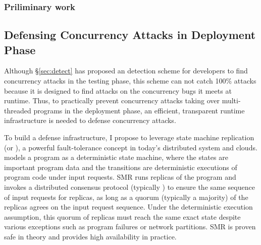  

\subsubsection{Priliminary work}\label{sec:detect-result}


\subsection{Defensing Concurrency Attacks in Deployment Phase} 
\label{sec:defense}

Although \S\ref{sec:detect} has proposed an detection scheme for developers to 
find concurrency attacks in the testing phase, this scheme can not catch 100\% 
attacks because it is designed to find attacks on the concurrency bugs it meets 
at runtime. Thus, to practically prevent concurrency attacks taking over 
multi-threaded programs in the deployment phase, an efficient, transparent 
runtime infrastructure is needed to defense concurrency attacks.

To build a defense infrastructure, I propose to leverage state machine 
replication (or \smr), a powerful fault-tolerance concept in today's 
distributed system and clouds. \smr models a program as a deterministic
state machine, where the states are important program data and the transitions 
are deterministic executions of program code under input requests. SMR runs 
replicas of the program and invokes a distributed consensus protocol 
(typically \paxos) to ensure the same sequence of input requests for replicas, 
as long as a quorum (typically a majority) of the replicas agrees on the input 
request sequence. Under the deterministic execution assumption, this quorum of 
replicas must reach the same exact state despite various exceptions such as 
program failures or network partitions. SMR is proven safe in theory and 
provides high availability in practice.

